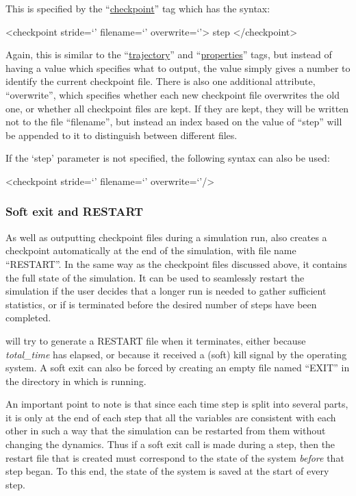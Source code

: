 \documentclass[11pt,english,fleqn]{report}
\newenvironment{code}{%
\footnotesize 
\verbatim
}{
\endverbatim
\normalsize
}
\begin{document}
This is specified by the {}``\hyperref[CHECKPOINT]{checkpoint}'' tag
which has the syntax:

\begin{code}
<checkpoint stride=`' filename=`' overwrite=`'>
   step
</checkpoint>
\end{code}

Again, this is similar to the {}``\hyperref[TRAJECTORY]{trajectory}'' and 
{}``\hyperref[PROPERTIES]{properties}''
tags, but instead of having a value which specifies what to output,
the value simply gives a number to identify the current checkpoint
file. There is also one additional attribute, {}``overwrite'', which
specifies whether each new checkpoint file overwrites the old one,
or whether all checkpoint files are kept. If they are kept, they will
be written not to the file {}``filename'', but instead an index
based on the value of {}``step'' will be appended to it to distinguish
between different files.

If the `step' parameter is not specified, the following syntax can
also be used:

\begin{code}
<checkpoint stride=`' filename=`' overwrite=`'/>
\end{code}


\subsubsection{Soft exit and RESTART}

As well as outputting checkpoint files during a simulation run, \ipi{} also
creates a checkpoint automatically at the end of the simulation, with
file name {}``RESTART''. In the same way as the checkpoint files discussed 
above, it contains the full state of the simulation. 
It can be used to seamlessly restart the simulation if the user decides 
that a longer run is needed to gather sufficient statistics, or if \ipi{} is terminated
before the desired number of steps have been completed.

\ipi will try to generate a RESTART file when it terminates, either because
\emph{total\_time} has elapsed, or because it received a (soft) kill signal 
by the operating system. A soft exit can also be forced by creating 
an empty file named ``EXIT'' in
the directory in which \ipi is running. 

An important point to note is that since each time step is split into
several parts, it is only at the end of each step that all the
variables are consistent with each other in such a way that the simulation
can be restarted from them without changing the dynamics. Thus if
a soft exit call is made during a step, then the restart file that
is created must correspond to the state of the system \emph{before} 
that step began. To this end, the state of the system is saved at the
start of every step.
\end{document}
